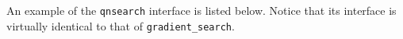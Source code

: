 %
%

An example of the {\tt qnsearch} interface is listed below.
Notice that its interface is virtually identical to that of
{\tt gradient\_search}.


